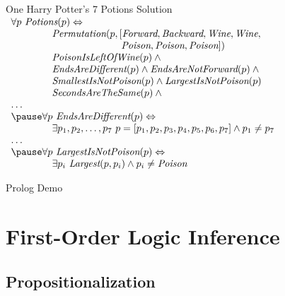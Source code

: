 \documentclass[14pt]{beamer}
\begin{document}
\begin{frame}{One Harry Potter's 7 Potions Solution}
	$
	\begin{array}{lll}
	\lefteqn{\forall p\ \textit{Potions}(p) \liff \mbox{}} \\
	& \textit{Permutation}(p, [\textit{Forward}, \textit{Backward}, \textit{Wine}, \textit{Wine}, \\
	& \hspace{7em}         \textit{Poison}, \textit{Poison}, \textit{Poison}]) \\
	& \textit{PoisonIsLeftOfWine}(p) \land \mbox{} \\
	& \textit{EndsAreDifferent}(p) \land \textit{EndsAreNotForward}(p) \land \mbox{} \\
	& \textit{SmallestIsNotPoison}(p) \land \textit{LargestIsNotPoison}(p) \\
	& \textit{SecondsAreTheSame}(p) \land \mbox{} \\
	\lefteqn{\ldots} \\
	\pause
	\lefteqn{\forall p\ \textit{EndsAreDifferent}(p) \liff \mbox{}} \\
	& \exists p_1, p_2, \ldots, p_7\ p = [p_1, p_2, p_3, p_4, p_5, p_6, p_7] \land p_1 \neq p_7 \\
	\lefteqn{\ldots} \\
	\pause
	\lefteqn{\forall p\ \textit{LargestIsNotPoison}(p) \liff \mbox{}} \\
	& \exists p_i\ \textit{Largest}(p, p_i) \land p_i \neq \textit{Poison}
	\end{array}
	$
\end{frame}
\begin{frame}
	\begin{center}
		\Huge Prolog Demo
	\end{center}
\end{frame}

\section{First-Order Logic Inference}

\subsection{Propositionalization}
\end{document}

